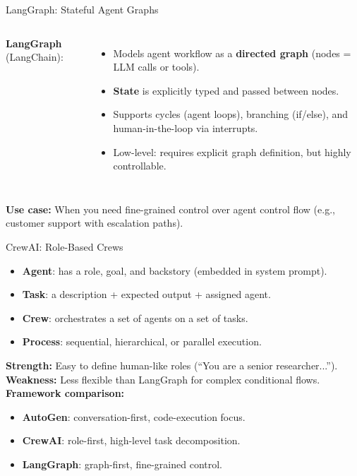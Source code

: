 \documentclass[aspectratio=169,10pt]{beamer}
\begin{document}
\begin{frame}{LangGraph: Stateful Agent Graphs}
  \begin{columns}[T]
      \textbf{LangGraph} (LangChain):
      \begin{itemize}
        \item Models agent workflow as a \textbf{directed graph} (nodes = LLM calls or tools).
        \item \textbf{State} is explicitly typed and passed between nodes.
        \item Supports cycles (agent loops), branching (if/else), and human-in-the-loop via interrupts.
        \item Low-level: requires explicit graph definition, but highly controllable.
      \end{itemize}
  \end{columns}
  \vspace{0.4em}
  \textbf{Use case:} When you need fine-grained control over agent control flow (e.g., customer support with escalation paths).
\end{frame}

\begin{frame}{CrewAI: Role-Based Crews}
  \begin{tcolorbox}[hitbox, title=CrewAI Concepts]
    \begin{itemize}
      \item \textbf{Agent}: has a role, goal, and backstory (embedded in system prompt).
      \item \textbf{Task}: a description + expected output + assigned agent.
      \item \textbf{Crew}: orchestrates a set of agents on a set of tasks.
      \item \textbf{Process}: sequential, hierarchical, or parallel execution.
    \end{itemize}
  \end{tcolorbox}
  \vspace{0.3em}
  \textbf{Strength:} Easy to define human-like roles (``You are a senior researcher...'').
  \textbf{Weakness:} Less flexible than LangGraph for complex conditional flows.
  \vspace{0.3em}\\
  \textbf{Framework comparison:}
  \begin{itemize}
    \item \textbf{AutoGen}: conversation-first, code-execution focus.
    \item \textbf{CrewAI}: role-first, high-level task decomposition.
    \item \textbf{LangGraph}: graph-first, fine-grained control.
  \end{itemize}
\end{frame}
\end{document}

